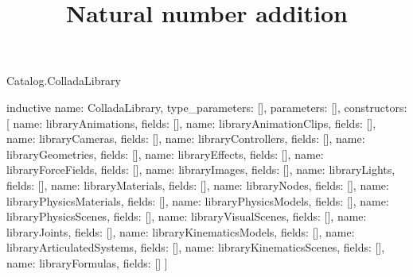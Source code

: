 \begin{lexlean}{Catalog.ColladaLibrary}
\title{Natural number addition}
\begin{semanticmodule}
inductive{
  name: ColladaLibrary,
  type_parameters: [],
  parameters: [],
  constructors: [
    {name: libraryAnimations, fields: []},
    {name: libraryAnimationClips, fields: []},
    {name: libraryCameras, fields: []},
    {name: libraryControllers, fields: []},
    {name: libraryGeometries, fields: []},
    {name: libraryEffects, fields: []},
    {name: libraryForceFields, fields: []},
    {name: libraryImages, fields: []},
    {name: libraryLights, fields: []},
    {name: libraryMaterials, fields: []},
    {name: libraryNodes, fields: []},
    {name: libraryPhysicsMaterials, fields: []},
    {name: libraryPhysicsModels, fields: []},
    {name: libraryPhysicsScenes, fields: []},
    {name: libraryVisualScenes, fields: []},
    {name: libraryJoints, fields: []},
    {name: libraryKinematicsModels, fields: []},
    {name: libraryArticulatedSystems, fields: []},
    {name: libraryKinematicsScenes, fields: []},
    {name: libraryFormulas, fields: []}
  ]
}
\end{semanticmodule}
\end{lexlean}
